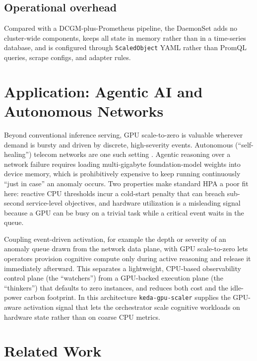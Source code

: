 \documentclass[11pt]{article}
\begin{document}
\subsection{Operational overhead}
Compared with a DCGM-plus-Prometheus pipeline, the DaemonSet adds no cluster-wide
components, keeps all state in memory rather than in a time-series database, and
is configured through \texttt{ScaledObject} YAML rather than PromQL queries,
scrape configs, and adapter rules.

\section{Application: Agentic AI and Autonomous Networks}

Beyond conventional inference serving, GPU scale-to-zero is valuable wherever
demand is bursty and driven by discrete, high-severity events. Autonomous
(``self-healing'') telecom networks are one such setting \cite{comsoc}. Agentic
reasoning over a network failure requires loading multi-gigabyte foundation-model
weights into device memory, which is prohibitively expensive to keep running
continuously ``just in case'' an anomaly occurs. Two properties make standard HPA
a poor fit here: reactive CPU thresholds incur a cold-start penalty that can
breach sub-second service-level objectives, and hardware utilization is a
misleading signal because a GPU can be busy on a trivial task while a critical
event waits in the queue.

Coupling event-driven activation, for example the depth or severity of an
anomaly queue drawn from the network data plane, with GPU scale-to-zero lets
operators provision cognitive compute only during active reasoning and release it
immediately afterward. This separates a lightweight, CPU-based observability
control plane (the ``watchers'') from a GPU-backed execution plane (the
``thinkers'') that defaults to zero instances, and reduces both cost and the
idle-power carbon footprint. In this architecture \texttt{keda-gpu-scaler}
supplies the GPU-aware activation signal that lets the orchestrator scale
cognitive workloads on hardware state rather than on coarse CPU metrics.

\section{Related Work}
\end{document}
